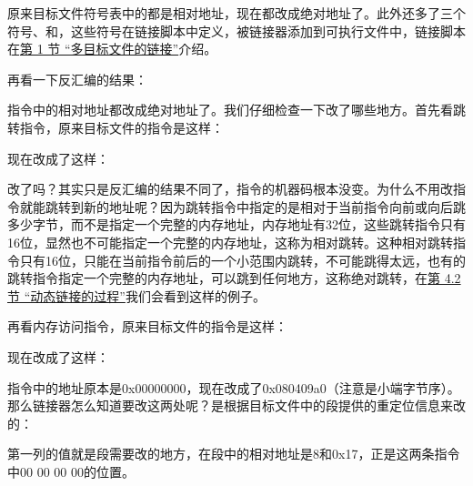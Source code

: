 原来目标文件符号表中的都是相对地址，现在都改成绝对地址了。此外还多了三个符号、和，这些符号在链接脚本中定义，被链接器添加到可执行文件中，链接脚本在\hyperlink{db.ch20s01.id2786161}{第 1 节 “多目标文件的链接”}介绍。



再看一下反汇编的结果：




指令中的相对地址都改成绝对地址了。我们仔细检查一下改了哪些地方。首先看跳转指令，原来目标文件的指令是这样：




现在改成了这样：




改了吗？其实只是反汇编的结果不同了，指令的机器码根本没变。为什么不用改指令就能跳转到新的地址呢？因为跳转指令中指定的是相对于当前指令向前或向后跳多少字节，而不是指定一个完整的内存地址，内存地址有32位，这些跳转指令只有16位，显然也不可能指定一个完整的内存地址，这称为相对跳转。这种相对跳转指令只有16位，只能在当前指令前后的一个小范围内跳转，不可能跳得太远，也有的跳转指令指定一个完整的内存地址，可以跳到任何地方，这称绝对跳转，在\hyperlink{db.ch20s04.id2790795}{第 4.\BookSplit{}2 节 “动态链接的过程”}我们会看到这样的例子。



再看内存访问指令，原来目标文件的指令是这样：




现在改成了这样：




指令中的地址原本是0x00000000，现在改成了0x080409a0（注意是小端字节序）。那么链接器怎么知道要改这两处呢？是根据目标文件中的段提供的重定位信息来改的：




第一列的值就是段需要改的地方，在段中的相对地址是8和0x17，正是这两条指令中00 00 00 00的位置。

